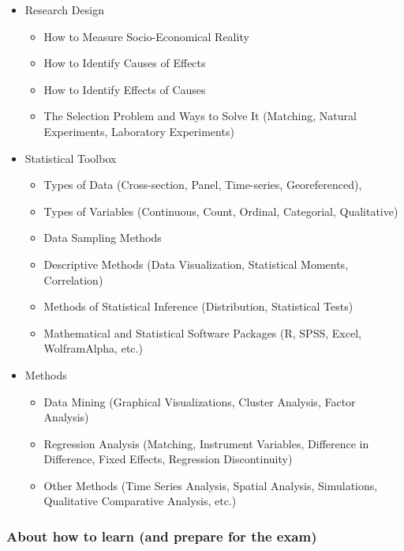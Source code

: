 \documentclass[
  12pt,
  oneside]{book}
\providecommand{\tightlist}{%
  \setlength{\itemsep}{0pt}\setlength{\parskip}{0pt}}
\theoremstyle{definition}
\theoremstyle{definition}
\theoremstyle{definition}
\theoremstyle{definition}
\theoremstyle{remark}
\begin{document}
\begin{itemize}
\item
  Research Design

  \begin{itemize}
  \tightlist
  \item
    How to Measure Socio-Economical Reality
  \item
    How to Identify Causes of Effects
  \item
    How to Identify Effects of Causes
  \item
    The Selection Problem and Ways to Solve It (Matching, Natural Experiments, Laboratory Experiments)
  \end{itemize}
\item
  Statistical Toolbox

  \begin{itemize}
  \tightlist
  \item
    Types of Data (Cross-section, Panel, Time-series, Georeferenced),
  \item
    Types of Variables (Continuous, Count, Ordinal, Categorial, Qualitative)
  \item
    Data Sampling Methods
  \item
    Descriptive Methods (Data Visualization, Statistical Moments, Correlation)
  \item
    Methods of Statistical Inference (Distribution, Statistical Tests)
  \item
    Mathematical and Statistical Software Packages (R, SPSS, Excel, WolframAlpha, etc.)
  \end{itemize}
\item
  Methods

  \begin{itemize}
  \tightlist
  \item
    Data Mining (Graphical Visualizations, Cluster Analysis, Factor Analysis)
  \item
    Regression Analysis (Matching, Instrument Variables, Difference in Difference, Fixed Effects, Regression Discontinuity)
  \item
    Other Methods (Time Series Analysis, Spatial Analysis, Simulations, Qualitative Comparative Analysis, etc.)
  \end{itemize}
\end{itemize}

\hypertarget{about-how-to-learn-and-prepare-for-the-exam}{%
\subsubsection*{About how to learn (and prepare for the exam)}\label{about-how-to-learn-and-prepare-for-the-exam}}
\end{document}
